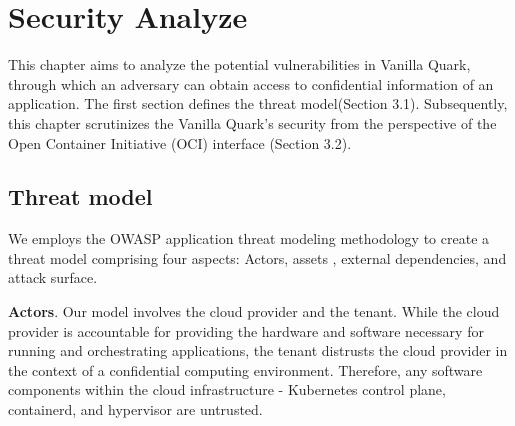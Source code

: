 \chapter{Security Analyze}
\label{sec:security_analyse}





This chapter aims to analyze the potential vulnerabilities in Vanilla Quark, through which an adversary can obtain access to confidential information of an application. The first section defines the threat model(Section 3.1). Subsequently, this chapter scrutinizes the Vanilla Quark's security from the perspective of the Open Container Initiative (OCI) interface (Section 3.2).



\section{Threat model}

We employs the OWASP application threat modeling methodology\cite*{OWASP_Threat_Modeling} to create a threat model comprising four aspects: Actors, assets , external dependencies, and attack surface.

\textbf{Actors}. Our model involves the cloud provider and the tenant. While the cloud provider is accountable for providing the hardware and software necessary for running and orchestrating applications, the tenant distrusts the cloud provider in the context of a confidential computing environment. Therefore, any software components within the cloud infrastructure - 
Kubernetes control plane\cite*{k8s}, containerd\cite*{containerd}, and hypervisor are untrusted.

